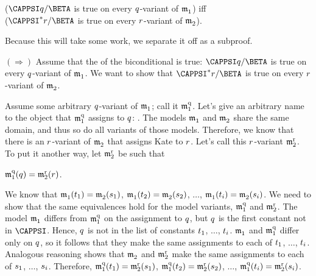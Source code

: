 \begin{PROOF}
\begin{description}
\begin{description}
\begin{center}
($\CAPPSI\variable{q}/\BETA$ is true on every $q$-variant of $\mathfrak{m^{\mathrm{}}_{\mathrm{1}}}$) iff\\
($\CAPPSI^*\variable{r}/\BETA$ is true on every $r$-variant of $\mathfrak{m^{\mathrm{}}_{\mathrm{2}}}$).
\end{center}
Because this will take some work, we separate it off as a subproof.
\begin{SUBPROOF} 
$(\Rightarrow)$ Assume that the  of the biconditional is true: $\CAPPSI\variable{q}/\BETA$ is true on every $q$-variant of $\mathfrak{m^{\mathrm{}}_{\mathrm{1}}}$.  We want to show that $\CAPPSI^*\variable{r}/\BETA$ is true on every $r$-variant of $\mathfrak{m^{\mathrm{}}_{\mathrm{2}}}$.

Assume some arbitrary $q$-variant of $\mathfrak{m^{\mathrm{}}_{\mathrm{1}}}$; call it $\mathfrak{m^{\mathrm{q}}_{\mathrm{1}}}$.  Let's give an arbitrary name to the object that $\mathfrak{m^{\mathrm{q}}_{\mathrm{1}}}$ assigns to $q$: .  The models $\mathfrak{m^{\mathrm{}}_{\mathrm{1}}}$ and $\mathfrak{m^{\mathrm{}}_{\mathrm{2}}}$ share the same domain, and thus so do all variants of those models.  Therefore, we know that there is an $r$-variant of $\mathfrak{m^{\mathrm{}}_{\mathrm{2}}}$ that assigns Kate to $r$.  Let's call this $r$-variant $\mathfrak{m^{\mathrm{r}}_{\mathrm{2}}}$.  To put it another way, let $\mathfrak{m^{\mathrm{r}}_{\mathrm{2}}}$ be such that
\begin{center}
	$\mathfrak{m^{\mathrm{q}}_{\mathrm{1}}}(q)=\mathfrak{m^{\mathrm{r}}_{\mathrm{2}}}(r)$.
\end{center}

We know that $\mathfrak{m^{\mathrm{}}_{\mathrm{1}}}(t_1)=\mathfrak{m^{\mathrm{}}_{\mathrm{2}}}(s_1)$, $\mathfrak{m^{\mathrm{}}_{\mathrm{1}}}(t_2)=\mathfrak{m^{\mathrm{}}_{\mathrm{2}}}(s_2)$, $\ldots$, $\mathfrak{m^{\mathrm{}}_{\mathrm{1}}}(t_{i})=\mathfrak{m^{\mathrm{}}_{\mathrm{2}}}(s_{i})$.  We need to show that the same equivalences hold for the model variants, $\mathfrak{m^{\mathrm{q}}_{\mathrm{1}}}$ and $\mathfrak{m^{\mathrm{r}}_{\mathrm{2}}}$.   The model $\mathfrak{m^{\mathrm{}}_{\mathrm{1}}}$ differs from $\mathfrak{m^{\mathrm{q}}_{\mathrm{1}}}$ on the assignment to $q$, but $q$ is the first constant not in $\CAPPSI$.  Hence, $q$ is not in the list of constants $t_1$, $\ldots$, $t_i$.  $\mathfrak{m^{\mathrm{}}_{\mathrm{1}}}$ and $\mathfrak{m^{\mathrm{q}}_{\mathrm{1}}}$ differ only on $q$, so it follows that they make the same assignments to each of $t_1$, $\ldots$, $t_i$.  Analogous reasoning shows that $\mathfrak{m^{\mathrm{}}_{\mathrm{2}}}$ and $\mathfrak{m^{\mathrm{r}}_{\mathrm{2}}}$ make the same assignments to each of $s_1$, $\ldots$, $s_i$.  Therefore, $\mathfrak{m^{\mathrm{q}}_{\mathrm{1}}}(t_1)=\mathfrak{m^{\mathrm{r}}_{\mathrm{2}}}(s_1)$, $\mathfrak{m^{\mathrm{q}}_{\mathrm{1}}}(t_2)=\mathfrak{m^{\mathrm{r}}_{\mathrm{2}}}(s_2)$, $\ldots$, $\mathfrak{m^{\mathrm{q}}_{\mathrm{1}}}(t_{i})=\mathfrak{m^{\mathrm{r}}_{\mathrm{2}}}(s_{i})$.


\end{SUBPROOF}
\end{description}
\end{description}
\end{PROOF}
